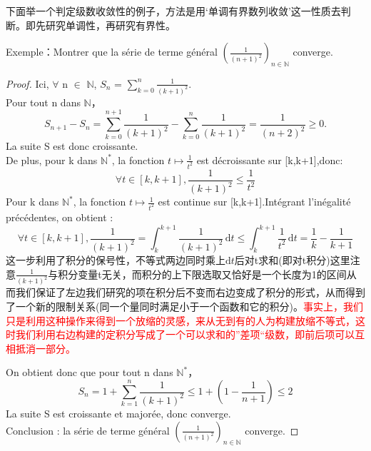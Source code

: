 \documentclass[12pt]{book}
\theoremstyle{definition}\newtheorem{dfn}{Définition}[chapter]
\theoremstyle{plain}\newtheorem{thm}{Théorème}[chapter]
\theoremstyle{plain}\newtheorem{prp}{Proposition}[chapter]
\theoremstyle{plain}\newtheorem{lem}{\bf Lemme}[chapter]
\theoremstyle{plain}\newtheorem{axm}{\bf Axiome}[chapter]
\theoremstyle{plain}\newtheorem{lmm}{\bf Lemme}[chapter]
\theoremstyle{plain}\newtheorem{cor}{\bf Corollaire}[chapter]
\theoremstyle{remark}\newtheorem{rem}{Remarque}[chapter]
\begin{document}
下面举一个判定级数收敛性的例子，方法是用`单调有界数列收敛’这一性质去判断。即先研究单调性，再研究有界性。


Exemple：Montrer que la série de terme général $(\frac{1}{(n+1)^2})_{n \in \mathbb{N}}$ converge.
\begin{proof}
        Ici, $\forall$ n $\in$ $\mathbb{N}$, $S_n$ = $\sum_{k=0}^{n} {\frac{1}{(k+1)^2}}$.
        \\Pour tout n dans $\mathbb{N}$，
        \begin{equation*}
        S_{n+1}-S_n=\sum_{k=0}^{n+1} {\frac{1}{(k+1)^2}}-\sum_{k=0}^{n} {\frac{1}{(k+1)^2}}=\frac{1}{(n+2)^2}\ge{0}.
        \end{equation*}
        La suite S est donc croissante.\\
        De plus, pour k dans $\mathbb{N^*}$, la fonction $ t\longmapsto \frac{1}{t^2} $ est décroissante sur [k,k+1],donc:
        \begin{equation*}
        \forall t \in [k,k+1], \frac{1}{(k+1)^2} \leqslant \frac{1}{t^2}
        \end{equation*}
        Pour k dans $\mathbb{N^*}$,
        la fonction  $ t\longmapsto \frac{1}{t^2} $ est continue sur [k,k+1].Intégrant l’inégalité précédentes, on obtient :
        \begin{equation*}
        \forall t \in [k,k+1],
        \frac{1}{(k+1)^2} = \int_k^{k+1} \frac{1}{(k+1)^2}\,\mathrm{d}t
        \leqslant \int_k^{k+1} \frac{1}{t^2}\,\mathrm{d}t=
        \frac{1}{k}-\frac{1}{k+1}
        \end{equation*}
        这一步利用了积分的保号性，不等式两边同时乘上$\mathrm{d}t$后对t求和(即对t积分)这里注意$\frac{1}{(k+1)^2}$与积分变量t无关，而积分的上下限选取又恰好是一个长度为1的区间从而我们保证了左边我们研究的项在积分后不变而右边变成了积分的形式，从而得到了一个新的限制关系(同一个量同时满足小于一个函数和它的积分)。\textcolor{red}{事实上，我们只是利用这种操作来得到一个放缩的灵感，来从无到有的人为构建放缩不等式，这时我们利用右边构建的定积分写成了一个可以求和的”差项“级数，即前后项可以互相抵消一部分。}


        On obtient donc que pour tout n dans $\mathbb{N^*}$，
        \begin{equation*}
        S_n=1+\sum_{k=1}^{n} {\frac{1}{(k+1)^2}}
        \leqslant 1+(1-\frac{1}{n+1})
        \leqslant 2
        \end{equation*}
        La suite S est croissante et majorée, donc converge.\\
        Conclusion : la série de terme général $(\frac{1}{(n+1)^2})_{n \in \mathbb{N}}$ converge.
\end{proof}
\end{document}
